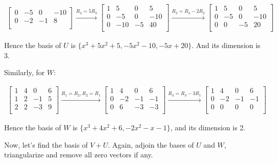 \documentclass[fleqn]{article}
\begin{document}
\begin{multline*}
\begin{bmatrix}
    0 & -5 & 0  & -10 \\
    0 & -2 & -1 & 8 \\
  \end{bmatrix}
  \xrightarrow{R_3 = 5R_3}
  \begin{bmatrix}
    1 & 5   & 0  & 5 \\
    0 & -5  & 0  & -10 \\
    0 & -10 & -5 & 40 \\
  \end{bmatrix}
  \xrightarrow{R_3 = R_3 - 2R_2}
  \begin{bmatrix}
    1 & 5  & 0  & 5 \\
    0 & -5 & 0  & -10 \\
    0 & 0  & -5 & 20 \\
  \end{bmatrix}
\end{multline*}


Hence the basis of $U$ is $\{x^3+5x^2+5, -5x^2-10, -5x+20\}$. And its dimension is 3.

Similarly, for $W$:

\begin{multline*}
  \begin{bmatrix}
    1 & 4 & 0  & 6 \\
    1 & 2 & -1 & 5 \\
    2 & 2 & -3 & 9 \\
  \end{bmatrix}
  \xrightarrow{R_1 = R_2, R_2 = R_1}
  \begin{bmatrix}
    1 & 4  &  0 & 6 \\
    0 & -2 & -1 & -1 \\
    0 & 6  & -3 & -3 \\
  \end{bmatrix}
  \xrightarrow{R_3 = R_3 - 3R_1}
  \begin{bmatrix}
    1 & 4  &  0 & 6 \\
    0 & -2 & -1 & -1 \\
    0 & 0  & 0 & 0 \\
  \end{bmatrix}
\end{multline*}




Hence the basis of $W$ is $\{x^3+4x^2+6, -2x^2-x-1\}$, and its dimension is 2.

Now, let's find the basis of $V+U$.  Again, adjoin the bases of $U$ and $W$,
triangularize and remove all zero vectors if any.
\end{document}
